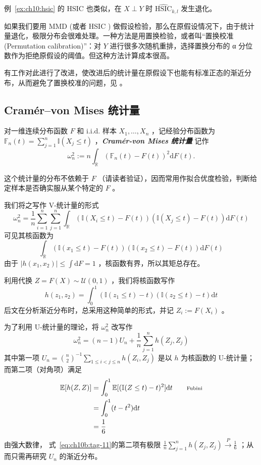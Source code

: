 例~\ref{ex:ch10:hsic} 的 HSIC 也类似，在 $X\perp Y$ 时 $\widehat{\text{HSIC}}_{k,l}$ 发生退化。

如果我们要用 MMD (或者 HSIC ) 做假设检验，那么在原假设情况下，由于统计量退化，极限分布会很难处理。一种方法是用置换检验，或者叫``置换校准 (Permutation calibration)''：对 $Y$ 进行很多次随机重排，选择置换分布的 α 分位数作为拒绝原假设的阈值。但这种方法计算成本很高。

有工作对此进行了改进，使改进后的统计量在原假设下也能有标准正态的渐近分布，从而避免了置换校准的问题，见 \cite{shekharkimramdas2022,kimramdas2024}。

\subsection{Cramér--von Mises 统计量}

对一维连续分布函数 $F$ 和 i.i.d. 样本 $X_1,\dots,X_n$ ，记经验分布函数为 $\textstyle\mathbb F_n(t)=\sum_{j=1}^n\mathbb I(X_j\le t)$ ，\textbf{\emph{Cramér-von Mises 统计量}} 记作
\[
\omega_n^2:=n\int_{\mathbb R}(\mathbb F_n(t)-F(t))^2\mathrm dF(t).
\]

这个统计量的分布不依赖于 $F$ （请读者验证），因而常用作拟合优度检验，判断给定样本是否确实服从某个特定的 $F$ 。

我们将之写作 V-统计量的形式
\[\omega_n^2=\frac1n\sum_{i=1}^n\sum_{j=1}^n\int_{\mathbb R}(\mathbb I(X_i\le t)-F(t))(\mathbb I(X_j\le t)-F(t))\mathrm dF(t)\]
可见其核函数为 $$\int_{\mathbb R}(\mathbb I(x_1\le t)-F(t))(\mathbb I(x_2\le t)-F(t))\mathrm{d}F(t)$$
由于 $\textstyle|h(x_1,x_2)|\le \int\mathrm dF=1$ ，核函数有界，所以其矩总存在。

利用代换 $Z=F(X)\sim\mathcal U(0,1)$ ，我们将核函数写作
\[h(z_1,z_2)=\int_0^1(\mathbb I(z_1\le t)-t)(\mathbb I(z_2\le t)-t)\mathrm dt\]
后文在分析渐近分布时，总采用这种简单的形式，并记 $Z_i:=F(X_i)$ 。

为了利用 U-统计量的理论，将 $\omega_n^2$ 改写作
\[\omega_n^2=(n-1)U_n+\frac1n\sum_{j=1}^nh(Z_j,Z_j)\]
其中第一项 $\textstyle U_n=\binom n2^{-1}\sum_{1\le i<j\le n}h(Z_i,Z_j)$ 是以 $h$ 为核函数的 U-统计量；而第二项（对角项）满足
\[\begin{aligned} \mathbb{E}[h(Z,Z)]&=\int_0^1\mathbb {E}[(\mathbb I(Z\le t)-t)^2]\mathrm dt\qquad \text{\scriptsize Fubini}\\ &=\int_0^1 (t-t^2)\mathrm dt\\ &=\frac16 \end{aligned}\]
由强大数律， 式~\eqref{eq:ch10b:tag-11}的第二项有极限 $\textstyle \frac1n\sum_{j=1}^nh(Z_j,Z_j)\overset P\to \frac16$ ；从而只需再研究 $U_n$ 的渐近分布。

